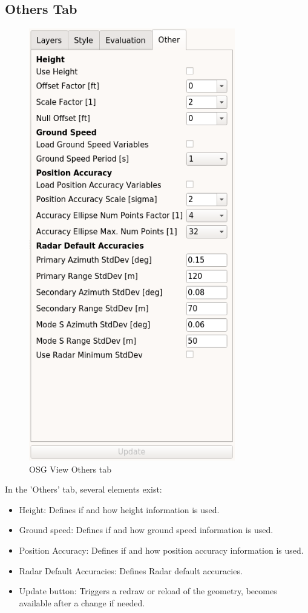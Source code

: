 \subsection{Others Tab}

\begin{figure}[H]
   \center
    \includegraphics[width=9cm,frame]{figures/osgview_others_tab.png}
  \caption{OSG View Others tab}
\end{figure}

In the 'Others' tab, several elements exist:

\begin{itemize}
 \item Height: Defines if and how height information is used.
 \item Ground speed: Defines if and how ground speed information is used.
 \item Position Accuracy: Defines if and how position accuracy information is used.
 \item Radar Default Accuracies: Defines Radar default accuracies.
 \item Update button: Triggers a redraw or reload of the geometry, becomes available after a change if needed.
\end{itemize} 

